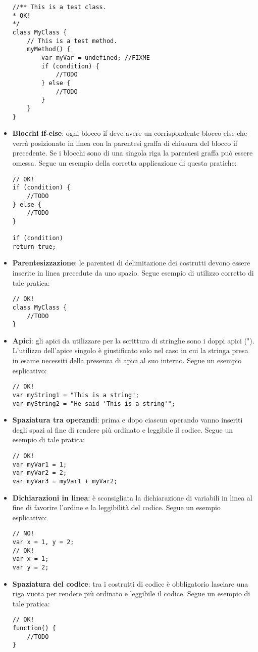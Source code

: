 \begin{itemize}
\begin{lstlisting}
//** This is a test class.
* OK!
*/
class MyClass {
	// This is a test method.
	myMethod() {
		var myVar = undefined; //FIXME
		if (condition) {
			//TODO
		} else {
			//TODO
		}
	}
}
\end{lstlisting}
	\item \textbf{Blocchi if-else}: ogni blocco if deve avere un corrispondente blocco else che verrà posizionato in linea con la parentesi graffa di chiusura del blocco if precedente. Se i blocchi sono di una singola riga la parentesi graffa può essere omessa. Segue un esempio della corretta applicazione di questa pratiche:
\begin{lstlisting}
// OK!
if (condition) {
	//TODO
} else {
	//TODO
}

if (condition)
return true;
\end{lstlisting}
	\item \textbf{Parentesizzazione}: le parentesi di delimitazione dei costrutti devono essere inserite in linea precedute da uno spazio. Segue esempio di utilizzo corretto di tale pratica:
\begin{lstlisting}
// OK!
class MyClass {
	//TODO
}
\end{lstlisting}
	\item \textbf{Apici}: gli apici da utilizzare per la scrittura di stringhe sono i doppi apici ("). L'utilizzo dell'apice singolo è giustificato solo nel caso in cui la stringa presa in esame necessiti della presenza di apici al suo interno. Segue un esempio esplicativo:
\begin{lstlisting}
// OK!
var myString1 = "This is a string";
var myString2 = "He said 'This is a string'";
\end{lstlisting}
	\item \textbf{Spaziatura tra operandi}: prima e dopo ciascun operando vanno inseriti degli spazi al fine di rendere più ordinato e leggibile il codice. Segue un esempio di tale pratica:
\begin{lstlisting}
// OK!
var myVar1 = 1;
var myVar2 = 2;
var myVar3 = myVar1 + myVar2;
\end{lstlisting}
	\item \textbf{Dichiarazioni in linea}: è sconsigliata la dichiarazione di variabili in linea al fine di favorire l'ordine e la leggibilità del codice. Segue un esempio esplicativo:
\begin{lstlisting}
// NO!
var x = 1, y = 2;
// OK!
var x = 1;
var y = 2;
\end{lstlisting}
	\item \textbf{Spaziatura del codice}: tra i costrutti di codice è obbligatorio lasciare una riga vuota per rendere più ordinato e leggibile il codice. Segue un esempio di tale pratica:
\begin{lstlisting}
// OK!
function() {
	//TODO
}


\end{lstlisting}
\end{itemize}

